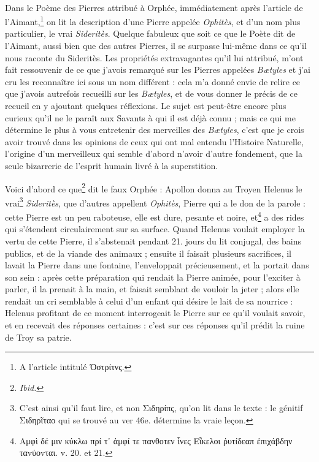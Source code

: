 \documentclass[a4paper, 11pt, oneside, polutonikogreek, french]{article}
\begin{document}
\paragraph{}
Dans le Poème des Pierres attribué à Orphée, immédiatement après l'article de l'Aimant,\footnote{A l'article intitulé Ὀστρίτνς.} on lit la description d'une Pierre appelée \emph{Ophitès}, et d'un nom plus particulier, le vrai \emph{Sideritès}. Quelque fabuleux que soit ce que le Poète dit de l'Aimant, aussi bien que des autres Pierres, il se surpasse lui-même dans ce qu'il nous raconte du Sideritès. Les propriétés extravagantes qu'il lui attribué, m'ont fait ressouvenir de ce que j'avois remarqué sur les Pierres appelées \emph{Bætyles} et j'ai cru les reconnaître ici sous un nom différent : cela m'a donné envie de relire ce que j'avois autrefois recueilli sur les \emph{Bætyles}, et de vous donner le précis de ce recueil en y ajoutant quelques réflexions. Le sujet est peut-être encore plus curieux qu'il ne le paraît aux Savants à qui il est déjà connu ; mais ce qui me détermine le plus à vous entretenir des merveilles des \emph{Bætyles}, c'est que je crois avoir trouvé dans les opinions de ceux qui ont mal entendu l'Histoire Naturelle, l'origine d'un merveilleux qui semble d'abord n'avoir d'autre fondement, que la seule bizarrerie de l'esprit humain livré à la superstition.

Voici d'abord ce que\footnote{\emph{Ibid.}} dit le faux Orphée : Apollon donna au Troyen Helenus le vrai\footnote{C'est ainsi qu'il faut lire, et non Σιδηρίπς, qu'on lit dans le texte : le génitif Σιδηρῖταο qui se trouvé au ver 46e. détermine la vraie leçon.} \emph{Sideritès}, que d'autres appellent \emph{Ophitès}, Pierre qui a le don de la parole : cette Pierre est un peu raboteuse, elle est dure, pesante et noire, et\footnote{Αμφὶ δέ μιν κύκλω πρί τ᾽ ἀμφί τε πανθοτεν ἶνες Εῗκελοι ῥυτίδεαπ ἐπιχάβδην ταvύοvται. v. 20. et 21.} a des rides qui s'étendent circulairement sur sa surface. Quand Helenus voulait employer la vertu de cette Pierre, il s'abstenait pendant 21. jours du lit conjugal, des bains publics, et de la viande des animaux ; ensuite il faisait plusieurs sacrifices, il lavait la Pierre dans une fontaine, l'enveloppait précieusement, et la portait dans son sein : après cette préparation qui rendait la Pierre animée, pour l'exciter à parler, il la prenait à la main, et faisait semblant de vouloir la jeter ; alors elle rendait un cri semblable à celui d'un enfant qui désire le lait de sa nourrice : Helenus profitant de ce moment interrogeait le Pierre sur ce qu'il voulait savoir, et en recevait des réponses certaines : c'est sur ces réponses qu'il prédit la ruine de Troy sa patrie.
\end{document}
